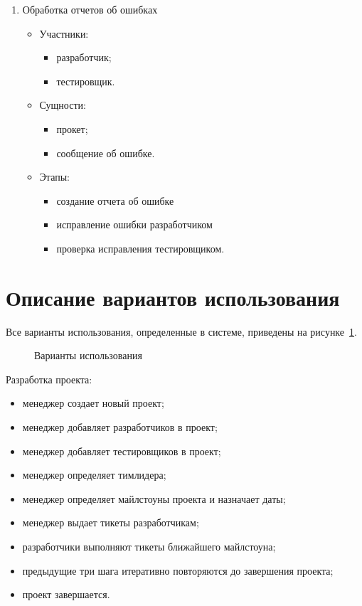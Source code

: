 \begin{enumerate}
\item Обработка отчетов об ошибках
	\begin{itemize}
	\item Участники:
		\begin{itemize}
		\item разработчик;
		\item тестировщик.
		\end{itemize}
	\item Сущности:
		\begin{itemize}
		\item прокет;
		\item сообщение об ошибке.
		\end{itemize}
	\item Этапы:
		\begin{itemize}
		\item создание отчета об ошибке
		\item исправление ошибки разработчиком
		\item проверка исправления тестировщиком.
		\end{itemize}
	\end{itemize}
\end{enumerate}

\section{Описание вариантов использования}
Все варианты использования, определенные в системе, приведены на рисунке~\ref{fig:useCases}.
\begin{figure}[h]
\caption{Варианты использования}
\label{fig:useCases}
\end{figure}

Разработка проекта:
\begin{itemize}
\item менеджер создает новый проект;
\item менеджер добавляет разработчиков в проект;
\item менеджер добавляет тестировщиков в проект;
\item менеджер определяет тимлидера;
\item менеджер определяет майлстоуны проекта и назначает даты;
\item менеджер выдает тикеты разработчикам;
\item разработчики выполняют тикеты ближайшего майлстоуна;
\item предыдущие три шага итеративно повторяются до завершения проекта;
\item проект завершается.
\end{itemize}

